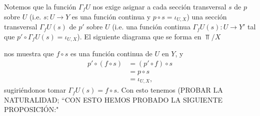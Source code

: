 
Notemos que la función $\Gamma_f U$ nos exige asignar a cada sección transversal $s$ de $p$ sobre $U$ (i.e. $s:U\to Y$ es una función continua y $p\circ s=\iota_{U,X}$) una sección transversal $\Gamma_f U (s)$ de $p'$ sobre $U$ (i.e. una función continua $\Gamma_f U (s):U\to Y'$ tal que $p'\circ \Gamma_f U(s)=\iota_{U,X}$). El siguiente diagrama que se forma en $\Top /X$

nos muestra que $f\circ s$ es una función continua de $U$ en $Y$, y
$$
\begin{aligned}
   p'\circ (f\circ s)&=(p'\circ f)\circ s\\
                     &=p\circ s\\
                     &=\iota_{U,X},
\end{aligned}
$$
sugiriéndonos tomar $\Gamma_f U (s)=f\circ s$. Con esto tenemos
(PROBAR LA NATURALIDAD; ``CON ESTO HEMOS PROBADO LA SIGUIENTE PROPOSICIÓN:"
\begin{Prop}
    
\end{Prop}
